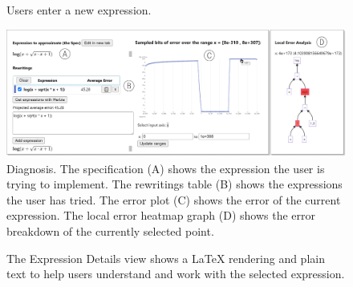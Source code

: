 \begin{figure}
  \centering
  \caption{Users enter a new expression.}
  \label{fig:new-tab}
\end{figure}

\begin{figure}
  \centering
  \includegraphics[width=\linewidth]{figures/diagnosis.png}
  \caption{Diagnosis.
  The specification (A) shows the expression the user is trying to implement.
  The rewritings table (B) shows the expressions the user has tried.
  The error plot (C) shows the error of the current expression.
  The local error heatmap graph (D)
    shows the error breakdown of the currently selected point.
  }
  \label{fig:diagnosis}
\end{figure}

\begin{figure}%
  \centering
  \caption{The Expression Details view shows 
  a LaTeX rendering and plain text to help users 
  understand and work with the selected expression.
  }
  \label{fig:expression-details}
\end{figure}

% 

